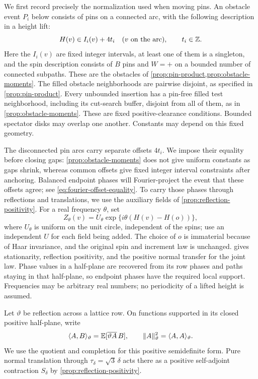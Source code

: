 We first record precisely the normalization used when moving pins.
An obstacle event $P_i$ below consists of pins on a connected arc,
with the following description in a height lift:
\begin{equation}\label{eq:obstacle-intervals}
 H(v)\in I_i(v)+4t_i\quad(v\text{ on the arc}),\qquad t_i\in\mathbb Z.
\end{equation}
Here the $I_i(v)$ are fixed integer intervals, at least one of them
is a singleton, and the spin description consists of $B$ pins and
$W=+$ on a bounded number of connected subpaths.  These are the
obstacles of \cref{prop:pin-product,prop:obstacle-moments}.
The filled obstacle neighborhoods are pairwise disjoint, as specified
in \cref{prop:pin-product}.  Every unbounded insertion has a pin-free
filled test neighborhood, including its cut-search buffer, disjoint
from all of them, as in \cref{prop:obstacle-moments}.  These are fixed
positive-clearance conditions.  Bounded spectator disks may overlap one
another.  Constants may depend on this fixed geometry.

The disconnected pin arcs carry separate offsets $4t_i$.  We impose
their equality before closing gaps: \cref{prop:obstacle-moments} does
not give uniform constants as gaps shrink, whereas common offsets give
fixed integer interval constraints after anchoring.  Balanced endpoint
phases will Fourier-project the event that these offsets agree;
see \eqref{eq:fourier-offset-equality}.  To carry those phases through
reflections and translations, we use the auxiliary fields of
\cref{prop:reflection-positivity}.  For a real frequency $\theta$, set
\begin{equation}\label{eq:haar-phase}
 Z_\theta(v)=U_\theta
       \exp\{i\theta(H(v)-H(o))\},
\end{equation}
where $U_\theta$ is uniform on the unit circle, independent of the
spins; use an independent $U$ for each field being added.  The choice
of $o$ is immaterial because of Haar invariance, and the original spin
and increment law is unchanged.   gives
stationarity, reflection positivity, and the positive normal transfer
for the joint law.  Phase values in a half-plane are recovered from
its row phases and paths staying in that half-plane, so endpoint phases
have the required local support.  Frequencies may be arbitrary real
numbers; no periodicity of a lifted height is assumed.

Let $\vartheta$ be reflection across a lattice row.  On functions
supported in its closed positive half-plane, write
\begin{equation}\label{eq:pins-reflection-product}
 \langle A,B\rangle_{\vartheta}
     =\mathbb E[\overline{\vartheta A}\,B],\qquad
 \|A\|_{\vartheta}^2=\langle A,A\rangle_{\vartheta}.
\end{equation}
We use the quotient and completion for this positive semidefinite
form.  Pure normal translation through
$\tau_\delta=\sqrt3\,\delta$ acts there as a positive self-adjoint
contraction $S_\delta$ by \cref{prop:reflection-positivity}.

